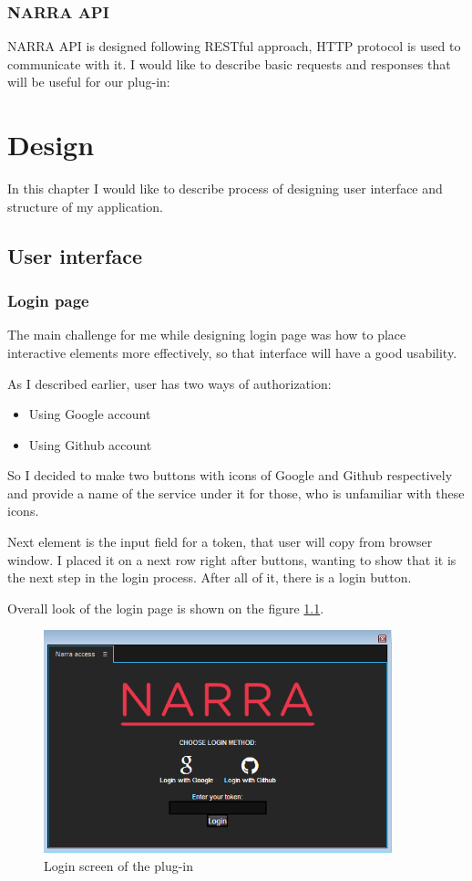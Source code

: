 \documentclass[thesis=B,english]{FITthesis}[2012/10/20]
\begin{document}
\subsection{NARRA API}
NARRA API is designed following RESTful approach, HTTP protocol is used to communicate with it. I would like to describe basic requests and responses that will be useful for our plug-in:
	
\chapter{Design}
In this chapter I would like to describe process of designing user interface and structure of my application.
\section{User interface}
\subsection{Login page}
The main challenge for me while designing login page was how to place interactive elements more effectively, so that interface will have a good usability.

As I described earlier, user has two ways of authorization: 
	\begin{itemize}
		\item Using Google account
		\item Using Github account
	\end{itemize}
So I decided to make two buttons with icons of Google and Github respectively and provide a name of the service under it for those, who is unfamiliar with these icons.

Next element is the input field for a token, that user will copy from browser window. I placed it on a next row right after buttons, wanting to show that it is the next step in the login process. After all of it, there is a login button.

Overall look of the login page is shown on the figure \ref{fig:login}.
	\begin{figure}
		\centering
		\includegraphics[width=0.9\textwidth]{LoginPage.png}
		\caption{Login screen of the plug-in}\label{fig:login}
	\end{figure}
\end{document}
